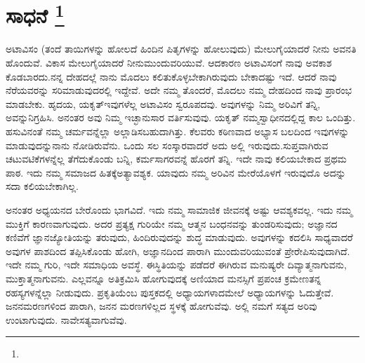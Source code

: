 
\chapter[ಸಾಧನೆ ]{ಸಾಧನೆ \protect\footnote{}}

ಅಟಾವಿಸಂ (ತಂದೆ ತಾಯಿಗಳನ್ನು ಹೋಲದೆ ಹಿಂದಿನ ಪಿತೃಗಳನ್ನು ಹೋಲುವುದು) ಮೇಲುಗೈಯಾದರೆ ನೀನು ಅವನತಿ ಹೊಂದುವೆ. ವಿಕಾಸ ಮೇಲುಗೈಯಾದರೆ ನೀನು\break ಮುಂದುವರಿಯುವೆ. ಆದಕಾರಣ ಅಟಾವಿಸಂಗೆ ನಾವು ಅವಕಾಶ ಕೊಡಬಾರದು.\break ನನ್ನ ದೇಹದಲ್ಲೆ ನಾನು ಮೊದಲು ಕಲಿತುಕೊಳ್ಳಬೇಕಾಗಿರುವುದು ಬೇಕಾದಷ್ಟು ಇದೆ. ಆದರೆ ನಾವು ನೆರೆಯವರನ್ನು ಸರಿಮಾಡುವುದರಲ್ಲಿ ಇದ್ದೇವೆ. ಅದೇ ನಮ್ಮ ತೊಂದರೆ, ಮೊದಲು ನಮ್ಮ ದೇಹದಿಂದ ನಾವು ಪ್ರಾರಂಭ ಮಾಡಬೇಕು. ಹೃದಯ, ಯಕೃತ್​\break ಇವುಗಳೆಲ್ಲ ಅಟಾವಿಸಂ ಸ್ವರೂಪದವು. ಅವುಗಳನ್ನು ನಿಮ್ಮ ಅರಿವಿಗೆ ತನ್ನಿ, ಅವನ್ನು\break ನಿಗ್ರಹಿಸಿ. ಅನಂತರ ಅವು ನಿಮ್ಮ ಇಚ್ಛಾನುಸಾರ ವರ್ತಿಸುವುವು. ಯಕೃತ್​ ನಮ್ಮ\break ಸ್ವಾಧೀನದಲ್ಲಿದ್ದ ಕಾಲ ಒಂದಿತ್ತು. ಹಸುವಿನಂತೆ ನಮ್ಮ ಚರ್ಮವನ್ನೆಲ್ಲಾ ಅಲ್ಲಾಡಿಸಬಹುದಾಗಿತ್ತು. ಕೆಲವರು ಕಠಿಣವಾದ ಅಭ್ಯಾಸ ಬಲದಿಂದ ಇವುಗಳನ್ನು ಮಾಡುವುದನ್ನು\break ನಾನು ನೋಡಿರುವೆನು. ಒಂದು ಸಲ ಸಂಸ್ಕಾರವಾದರೆ ಅದು ಅಲ್ಲಿ ಇರುವುದು.\break ಸುಪ್ತವಾಗಿರುವ ಚಟುವಟಿಕೆಗಳನ್ನೆಲ್ಲ ತೆಗೆದುಕೊಂಡು ಬನ್ನಿ, ಕರ್ಮಸಾಗರವನ್ನೆ ಹೊರಗೆ ತನ್ನಿ. ಇದೇ ನಾವು ಕಲಿಯಬೇಕಾದ ಪ್ರಥಮ ಪಾಠ. ಇದು ನಮ್ಮ ಸಮಾಜದ ಹಿತಕ್ಕೆ\break ಅತ್ಯಾವಶ್ಯಕ. ಯಾವುದು ನಮ್ಮ ಅರಿವಿನ ಮೇರೆಯೊಳಗೆ ಇರುವುದೊ ಅದನ್ನು ಸದಾ ಕಲಿಯಬೇಕಾಗಿಲ್ಲ.

\vskip 0.1cm

ಅನಂತರ ಅಧ್ಯಯನದ ಬೇರೊಂದು ಭಾಗವಿದೆ. ಇದು ನಮ್ಮ ಸಾಮಾಜಿಕ ಜೀವನಕ್ಕೆ ಅಷ್ಟು ಆವಶ್ಯಕವಲ್ಲ. ಇದು ನಮ್ಮ ಮುಕ್ತಿಗೆ ಕಾರಣವಾಗುವುದು. ಅದರ ಪ್ರತ್ಯಕ್ಷ ಗುರಿಯೇ ನಮ್ಮ ಆತ್ಮನ ಬಂಧನವನ್ನು ತುಂಡರಿಸುವುದು; ಅಜ್ಞಾನದ ಕಣಿವೆಗೆ ಜ್ಞಾನಜ್ಯೋತಿಯನ್ನು ತರುವುದು, ಹಿಂದಿರುವುದನ್ನು ಶುದ್ಧ ಮಾಡುವುದು. ಅವುಗಳನ್ನು ಕದಲಿಸಿ ಸಾಧ್ಯವಾದರೆ ಅವುಗಳ ಪಾಶದಿಂದ ತಪ್ಪಿಸಿಕೊಂಡು ಹೋಗಿ, ಅಜ್ಞಾನದಿಂದ ಪಾರಾಗಿ ಮುಂದುವರಿಯುವಂತೆ ಪ್ರೇರೇಪಿಸುವುದಾಗಿದೆ. ಇದೇ ನಮ್ಮ ಗುರಿ, ಇದೇ ಸಮಾಧಿಯ ಅವಸ್ಥೆ. ಈ\break ಸ್ಥಿತಿಯನ್ನು ಪಡೆದರೆ ಈಗಿರುವ ಮನುಷ್ಯರೇ ದಿವ್ಯಾತ್ಮನಾಗುವನು, ಮುಕ್ತಾತ್ಮನಾಗುವನು. ಎಲ್ಲವನ್ನೂ ಅತಿಕ್ರಮಿಸಿ ಹೋಗುವುದಕ್ಕೆ ಅಣಿಯಾದ ಮನಸ್ಸಿಗೆ ಪ್ರಪಂಚ ಕ್ರಮೇಣ\break ತನ್ನ ರಹಸ್ಯಗಳನ್ನೆಲ್ಲಾ ನೀಡುವುದು. ಪ್ರಕೃತಿಯೆಂಬ ಪುಸ್ತಕದಲ್ಲಿ ಅಧ್ಯಾಯಗಳಾದ\break ಮೇಲೆ ಅಧ್ಯಾಯಗಳನ್ನು ಓದುತ್ತೇವೆ. ಜನನಮರಣಗಳಿಂದ ಪಾರಾಗಿ, ಜನನ ಮರಣಗಳಿಲ್ಲದ ಸ್ಥಳಕ್ಕೆ ಹೋಗುವೆವು. ಅಲ್ಲಿ ನಮಗೆ ಸತ್ಯದ ಅರಿವು ಉಂಟಾಗುವುದು. ನಾವೇ\break ಸತ್ಯವಾಗುವೆವು.

\vskip 0.1cm

